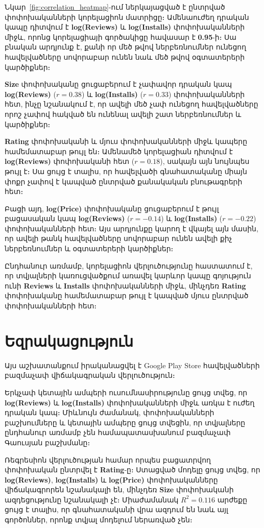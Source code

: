 \documentclass[11pt]{article}
\begin{document}
Նկար~\ref{fig:correlation_heatmap}-ում ներկայացված է ընտրված փոփոխականների կորելացիոն մատրիցը։ Ամենաուժեղ դրական կապը դիտվում է \textbf{log(Reviews)} և \textbf{log(Installs)} փոփոխականների միջև, որոնց կորելացիայի գործակիցը հավասար է \textbf{0.95}-ի։ Սա բնական արդյունք է, քանի որ մեծ թվով ներբեռնումներ ունեցող հավելվածները սովորաբար ունեն նաև մեծ թվով օգտատերերի կարծիքներ։

\textbf{Size} փոփոխականը ցուցաբերում է չափավոր դրական կապ \textbf{log(Reviews)} (\(r=0.38\)) և \textbf{log(Installs)} (\(r=0.33\)) փոփոխականների հետ, ինչը նշանակում է, որ ավելի մեծ չափ ունեցող հավելվածները որոշ չափով հակված են ունենալ ավելի շատ ներբեռնումներ և կարծիքներ։

\textbf{Rating} փոփոխականի և մյուս փոփոխականների միջև կապերը համեմատաբար թույլ են։ Ամենամեծ կորելացիան դիտվում է \textbf{log(Reviews)} փոփոխականի հետ (\(r=0.18\)), սակայն այն նույնպես թույլ է։ Սա ցույց է տալիս, որ հավելվածի գնահատականը միայն փոքր չափով է կապված ընտրված քանակական բնութագրերի հետ։

Բացի այդ, \textbf{log(Price)} փոփոխականը ցուցաբերում է թույլ բացասական կապ \textbf{log(Reviews)} (\(r=-0.14\)) և \textbf{log(Installs)} (\(r=-0.22\)) փոփոխականների հետ։ Այս արդյունքը կարող է վկայել այն մասին, որ ավելի թանկ հավելվածները սովորաբար ունեն ավելի քիչ ներբեռնումներ և օգտատերերի կարծիքներ։

Ընդհանուր առմամբ, կորելացիոն վերլուծությունը հաստատում է, որ տվյալների կառուցվածքում առավել կարևոր կապը գոյություն ունի \textbf{Reviews} և \textbf{Installs} փոփոխականների միջև, մինչդեռ \textbf{Rating} փոփոխականը համեմատաբար թույլ է կապված մյուս ընտրված փոփոխականների հետ։


\section{Եզրակացություն}

Այս աշխատանքում իրականացվել է Google Play Store հավելվածների բազմաչափ վիճակագրական վերլուծություն։

Երկչափ կետային ամպերի ուսումնասիրությունը ցույց տվեց, որ \textbf{log(Reviews)} և \textbf{log(Installs)} փոփոխականների միջև առկա է ուժեղ դրական կապ։ Միևնույն ժամանակ, փոփոխականների բաշխումները և կետային ամպերը ցույց տվեցին, որ տվյալները ընդհանուր առմամբ չեն համապատասխանում բազմաչափ Գաուսյան բաշխմանը։

Ռեգրեսիոն վերլուծության համար որպես բացատրվող փոփոխական ընտրվել է \textbf{Rating}-ը։ Ստացված մոդելը ցույց տվեց, որ \textbf{log(Reviews)}, \textbf{log(Installs)} և \textbf{log(Price)} փոփոխականները վիճակագրորեն նշանակալի են, մինչդեռ \textbf{Size} փոփոխականի ազդեցությունը նշանակալի չէ։ Միաժամանակ \(R^2=0.116\) արժեքը ցույց է տալիս, որ գնահատականի վրա ազդում են նաև այլ գործոններ, որոնք տվյալ մոդելում ներառված չեն։
\end{document}
